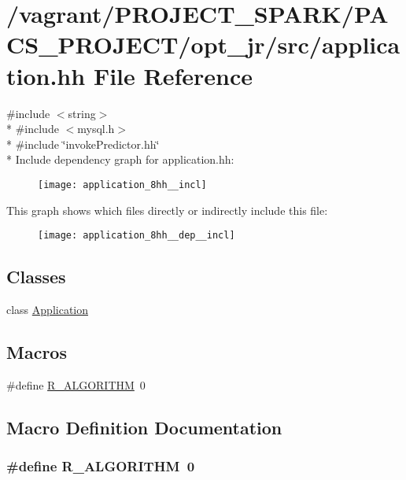 \hypertarget{application_8hh}{\section{/vagrant/\-P\-R\-O\-J\-E\-C\-T\-\_\-\-S\-P\-A\-R\-K/\-P\-A\-C\-S\-\_\-\-P\-R\-O\-J\-E\-C\-T/opt\-\_\-jr/src/application.hh File Reference}
\label{application_8hh}
}
{\ttfamily \#include $<$string$>$}\\*
{\ttfamily \#include $<$mysql.\-h$>$}\\*
{\ttfamily \#include \char`\"{}invoke\-Predictor.\-hh\char`\"{}}\\*
Include dependency graph for application.\-hh\-:\nopagebreak
\begin{figure}[H]
\begin{center}
\leavevmode
\texttt{[image: application\_8hh\_\_incl]}
\end{center}
\end{figure}
This graph shows which files directly or indirectly include this file\-:\nopagebreak
\begin{figure}[H]
\begin{center}
\leavevmode
\texttt{[image: application\_8hh\_\_dep\_\_incl]}
\end{center}
\end{figure}
\subsection*{Classes}
\begin{DoxyCompactItemize}
\item 
class \hyperlink{classApplication}{Application}
\end{DoxyCompactItemize}
\subsection*{Macros}
\begin{DoxyCompactItemize}
\item 
\#define \hyperlink{application_8hh_aaeed326368abd712225f9ca34c338fbf}{R\-\_\-\-A\-L\-G\-O\-R\-I\-T\-H\-M}~0
\end{DoxyCompactItemize}


\subsection{Macro Definition Documentation}
\hypertarget{application_8hh_aaeed326368abd712225f9ca34c338fbf}{
\subsubsection[{R\-\_\-\-A\-L\-G\-O\-R\-I\-T\-H\-M}]{\setlength{\rightskip}{0pt plus 5cm}\#define R\-\_\-\-A\-L\-G\-O\-R\-I\-T\-H\-M~0}}\label{application_8hh_aaeed326368abd712225f9ca34c338fbf}
